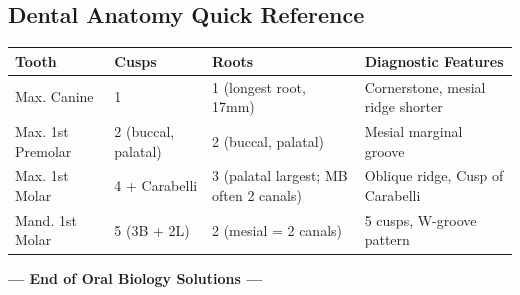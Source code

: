 \documentclass[11pt,a4paper]{article}
\begin{document}
\subsection{Dental Anatomy Quick Reference}
\begin{center}
\begin{tabular}{llll}
\toprule
\textbf{Tooth} & \textbf{Cusps} & \textbf{Roots} & \textbf{Diagnostic Features} \\
\midrule
Max. Canine & 1 & 1 (longest root, 17mm) & Cornerstone, mesial ridge shorter \\
Max. 1st Premolar & 2 (buccal, palatal) & 2 (buccal, palatal) & Mesial marginal groove \\
Max. 1st Molar & 4 + Carabelli & 3 (palatal largest; MB often 2 canals) & Oblique ridge, Cusp of Carabelli \\
Mand. 1st Molar & 5 (3B + 2L) & 2 (mesial = 2 canals) & 5 cusps, W-groove pattern \\
\bottomrule
\end{tabular}
\end{center}

\vspace{1cm}
\begin{center}
\textbf{--- End of Oral Biology Solutions ---}
\end{center}
\end{document}
